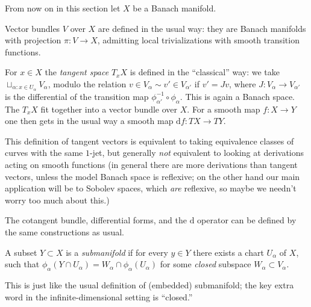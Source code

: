\documentclass[12pt,letterpaper,reqno]{article}
\numberwithin{equation}{section}
\newcommand{\de}{\mathrm{d}}
\newcommand{\ti}[1]{\textit{#1}}
\begin{document}
From now on in this section let $X$ be a Banach manifold.

\begin{defn} Vector bundles $V$ over $X$
are defined in the usual way: they are Banach manifolds
with projection $\pi: V \to X$, admitting local trivializations with
smooth transition functions.
\end{defn}

\begin{defn} For $x \in X$ the \ti{tangent space} $T_x X$
is defined in the ``classical'' way: we take
$\sqcup_{\alpha: x \in U_\alpha} V_\alpha$, modulo
the relation $v \in V_\alpha \sim v' \in V_{\alpha'}$ if
$v' = Jv$, where $J: V_\alpha \to V_{\alpha'}$ is the differential
of the transition map $\phi_{\alpha'}^{-1} \circ \phi_\alpha$.
This is again a Banach space. The $T_x X$ fit together into a vector bundle
over $X$. For a smooth map $f: X \to Y$ one then gets in the usual
way a smooth map $\de f: TX \to TY$.
\end{defn}

This definition of tangent vectors is equivalent to taking
equivalence classes of curves with the same $1$-jet,
but generally \ti{not} equivalent to looking at derivations acting on
smooth functions (in general there are more derivations
than tangent vectors, unless the model Banach space
is reflexive; on the other hand our main application will
be to Sobolev spaces, which \ti{are} reflexive, so maybe
we needn't worry too much about this.)

\begin{defn} The cotangent bundle,
differential forms, and the $\de$ operator can be defined by the same
constructions as usual.
\end{defn}

\begin{defn}[Submanifold] A subset $Y \subset X$ is a \ti{submanifold}
if for every $y \in Y$ there exists a chart $U_\alpha$ of $X$,
such that $\phi_\alpha(Y \cap U_\alpha) = W_\alpha \cap \phi_\alpha(U_\alpha)$
for some \ti{closed} subspace $W_\alpha \subset V_\alpha$.
\end{defn}

This is just like the usual definition of (embedded) submanifold;
the key extra word in the infinite-dimensional setting
is ``closed.''

\end{document}

